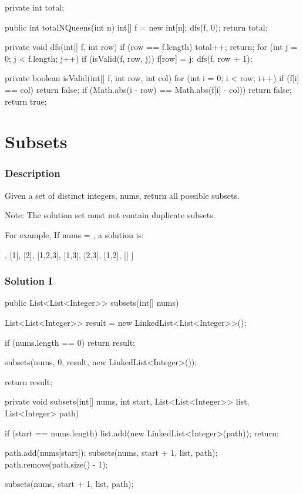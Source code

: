 \begin{Code}
private int total;

public int totalNQueens(int n) {
    int[] f = new int[n];
    dfs(f, 0);
    return total;
}

private void dfs(int[] f, int row) {
    if (row == f.length) {
        total++;
        return;
    }
    for (int j = 0; j < f.length; j++) {
        if (isValid(f, row, j)) {
            f[row] = j;
            dfs(f, row + 1);
        }
    }
}

private boolean isValid(int[] f, int row, int col) {
    for (int i = 0; i < row; i++) {
        if (f[i] == col) {
            return false;
        }
        if (Math.abs(i - row) == Math.abs(f[i] - col)) {
            return false;
        }
    }
    return true;
}
\end{Code}

\newpage

\section{Subsets} %

\subsubsection{Description}

Given a set of distinct integers, nums, return all possible subsets.

Note: The solution set must not contain duplicate subsets.

For example,
If nums = \code{[1,2,3]}, a solution is:

\begin{Code}
[
  [3],
  [1],
  [2],
  [1,2,3],
  [1,3],
  [2,3],
  [1,2],
  []
]
\end{Code}

\subsubsection{Solution I}

\begin{Code}
public List<List<Integer>> subsets(int[] nums) {
    List<List<Integer>> result = new LinkedList<List<Integer>>();

    if (nums.length == 0) {
        return result;
    }

    subsets(nums, 0, result, new LinkedList<Integer>());

    return result;
}

private void subsets(int[] nums, int start, List<List<Integer>> list, List<Integer> path) {
    if (start == nums.length) {
        list.add(new LinkedList<Integer>(path));
        return;
    }

    path.add(nums[start]);
    subsets(nums, start + 1, list, path);
    path.remove(path.size() - 1);

    subsets(nums, start + 1, list, path);
}
\end{Code}

